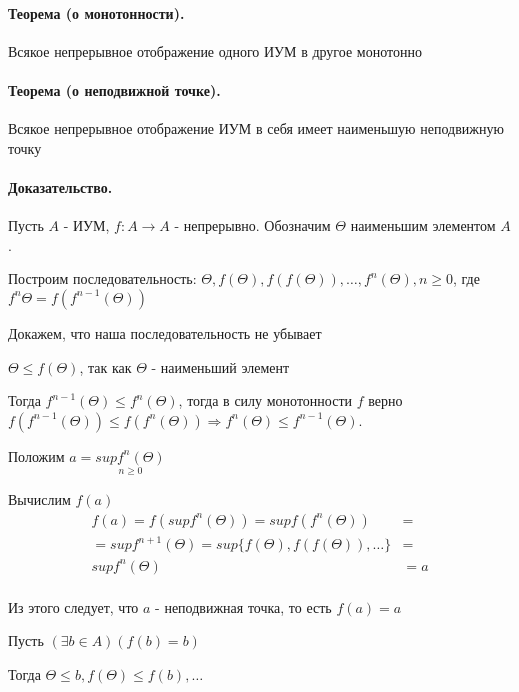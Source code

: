 \documentclass{report}
\begin{document}
\paragraph*{Теорема (о монотонности).}
Всякое непрерывное отображение одного ИУМ в другое монотонно


\paragraph*{Теорема (о неподвижной точке).}
Всякое непрерывное отображение ИУМ в себя имеет наименьшую неподвижную точку
\paragraph*{Доказательство.}
Пусть $A$ - ИУМ, $f: A \rightarrow A$ - непрерывно. Обозначим $\Theta$ наименьшим элементом $A$.\newline

Построим последовательность:\newline
$\Theta, f(\Theta), f(f(\Theta)), \ldots, f^{n}(\Theta), n \geq 0$,
где $f^{n}{\Theta} = f(f^{n - 1}(\Theta))$

\medskip
Докажем, что наша последовательность не убывает


$\Theta \leq f(\Theta)$, так как $\Theta$ - наименьший элемент

\medskip

Тогда $f^{n-1}(\Theta) \leq f^{n}(\Theta)$, тогда в силу монотонности $f$ верно
$f(f^{n-1}(\Theta)) \leq f(f^{n}(\Theta)) \Rightarrow f^{n}(\Theta) \leq f^{n-1}(\Theta)$.

\medskip

Положим $a = \underset{n \geq 0}{supf^{n}(\Theta)}$

\medskip


Вычислим $f(a)$
\begin{align*}
    f(a) = f(supf^{n}(\Theta)) = supf(f^{n}(\Theta))              & =   \\
    = supf^{n+1}(\Theta) = sup\{f(\Theta), f(f(\Theta)), \ldots\} & =   \\
    supf^n(\Theta)                                                & = a \\
\end{align*}

Из этого следует, что $a$ - неподвижная точка, то есть $f(a) = a$

\medskip

Пусть $(\exists b \in A)(f(b) = b)$


Тогда $\Theta \leq b, f(\Theta) \leq f(b), \ldots$
\end{document}
